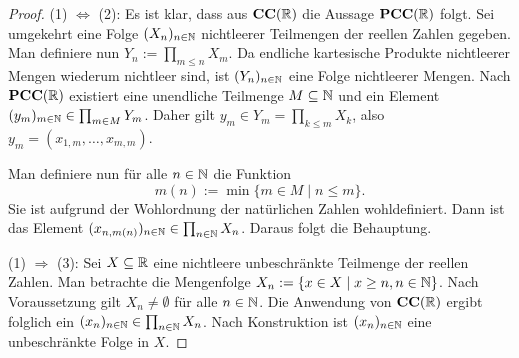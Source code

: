 \begin{proof}
  (1) $\Leftrightarrow$ (2):
  Es ist klar, dass aus $\mathbf{CC}(\mathbb{R})$ die Aussage $\mathbf{PCC}(\mathbb{R})$ folgt.
  Sei umgekehrt eine Folge $(X_n)_{n \in \mathbb{N}}$ nichtleerer Teilmengen der reellen Zahlen gegeben.
  Man definiere nun $Y_n := \prod_{m \leq n} X_m$.
  Da endliche kartesische Produkte nichtleerer Mengen wiederum nichtleer sind, ist $(Y_n)_{n \in \mathbb{N}}$ eine Folge nichtleerer Mengen.
  Nach $\mathbf{PCC}(\mathbb{R})$ existiert eine unendliche Teilmenge $M \subseteq \mathbb{N}$ und ein Element $(y_m)_{m \in \mathbb{N}} \in \prod_{m \in M} Y_m$.
  Daher gilt $y_m \in Y_m = \prod_{k \leq m} X_k$, also $y_m = (x_{1,m},\dots,x_{m,m})$.

  Man definiere nun für alle $n \in \mathbb{N}$ die Funktion
  \begin{displaymath}
    m(n) := \min\{m \in M \mid n \leq m\}.
  \end{displaymath}
  Sie ist aufgrund der Wohlordnung der natürlichen Zahlen wohldefiniert.
  Dann ist das Element $(x_{n,m(n)})_{n \in \mathbb{N}} \in \prod_{n \in \mathbb{N}} X_n$.
  Daraus folgt die Behauptung.

  (1) $\Rightarrow$ (3):
  Sei $X \subseteq \mathbb{R}$ eine nichtleere unbeschränkte Teilmenge der reellen Zahlen.
  Man betrachte die Mengenfolge $X_n := \{x \in X \mid x \geq n, n \in \mathbb{N}\}$.
  Nach Voraussetzung gilt $X_n \neq \emptyset$ für alle $n \in \mathbb{N}$.
  Die Anwendung von $\mathbf{CC}(\mathbb{R})$ ergibt folglich ein $(x_n)_{n \in \mathbb{N}} \in \prod_{n \in \mathbb{N}} X_n$.
  Nach Konstruktion ist $(x_n)_{n \in \mathbb{N}}$ eine unbeschränkte Folge in $X$.


\end{proof}
